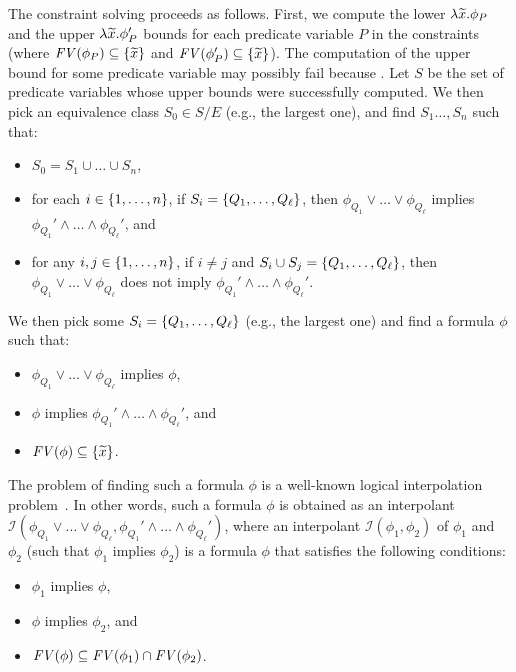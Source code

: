  The constraint 
solving proceeds as follows.  First, we compute the lower \(\lambda 
\widetilde{x}.\phi_P\) and the upper \(\lambda \widetilde{x}.\phi_P'\) bounds for 
each predicate variable \(P\) in the constraints (where \(\mathit{FV}({\phi_P}) 
\subseteq \{{\widetilde{x}}\}\) and \(\mathit{FV}({\phi_P'}) \subseteq \{{\widetilde{x}}\}\)). 
 The computation of the upper bound for some predicate variable may 
possibly fail because \todo{}.  Let \(S\) be the set of predicate 
variables whose upper bounds were successfully computed.  We then pick 
an equivalence class \(S_0 \in S / E\) (e.g., the largest one), and find 
\(S_1\dots,S_n\) such that:
\begin{itemize}
\item \(S_0 = S_1 \cup \dots \cup S_n\),
\item for each \(i \in \{{1,\dots,n}\}\), if \(S_i = 
\{{Q_1,\dots,Q_{\ell}}\}\), then \(\phi_{Q_1} \lor \dots \lor 
\phi_{Q_{\ell}}\) implies \(\phi_{Q_1}' \land \dots \land 
\phi_{Q_{\ell}}'\), and
\item for any \(i,j \in \{{1,\dots,n}\}\), if \(i \neq j\) and 
\(S_i \cup S_j = \{{Q_1,\dots,Q_{\ell}}\}\), then \(\phi_{Q_1} \lor 
\dots \lor \phi_{Q_{\ell}}\) does not imply \(\phi_{Q_1}' \land \dots 
\land \phi_{Q_{\ell}}'\).
\end{itemize}
We then pick some \(S_i = \{{Q_1,\dots,Q_{\ell}}\}\) (e.g., the largest 
one) and find a formula \(\phi\) such that:
\begin{itemize}
\item \(\phi_{Q_1} \lor \dots \lor \phi_{Q_{\ell}}\) implies \(\phi\),
\item \(\phi\) implies \(\phi_{Q_1}' \land \dots \land \phi_{Q_{\ell}}'\), and
\item \(\mathit{FV}({\phi}) \subseteq \{{\widetilde{x}}\}\).
\end{itemize}
The problem of finding such a formula \(\phi\) is a well-known logical 
interpolation problem~\cite{}.  In other words, such a formula \(\phi\) 
is obtained as an interpolant \(\mathcal{I}(\phi_{Q_1} \lor \dots \lor 
\phi_{Q_{\ell}},\phi_{Q_1}' \land \dots \land \phi_{Q_{\ell}}')\), where 
an interpolant \(\mathcal{I}(\phi_1,\phi_2)\) of \(\phi_1\) and 
\(\phi_2\) (such that \(\phi_1\) implies \(\phi_2\)) is a formula 
\(\phi\) that satisfies the following conditions:
\begin{itemize}
\item \(\phi_1\) implies \(\phi\),
\item \(\phi\) implies \(\phi_2\), and
\item \(\mathit{FV}({\phi}) \subseteq \mathit{FV}({\phi_1}) \cap \mathit{FV}({\phi_2})\).
\end{itemize}
